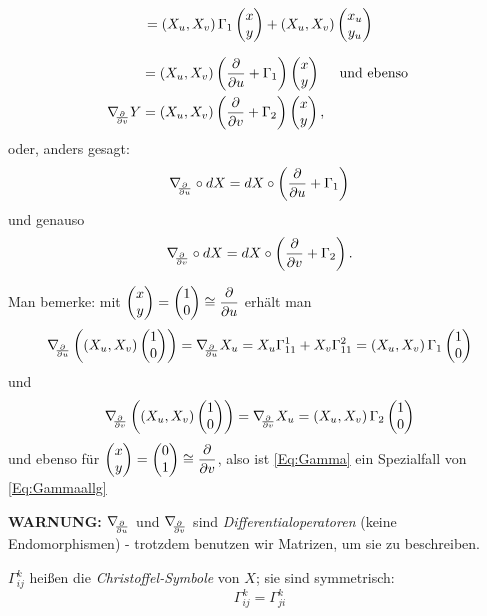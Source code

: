 		\[ = \left( X_u, X_v \right) \Gamma_1\begin{pmatrix} x \\ y \end{pmatrix} + \left( X_u, X_v \right) \begin{pmatrix} x_u \\ y_u \end{pmatrix} \] 
		
		\begin{equation} \label{Eq:Gammaallg}
		\begin{split}
			&= \left( X_u, X_v \right) \left( \dfrac{\partial}{\partial u} +\Gamma_1 \right) \begin{pmatrix} x \\ y \end{pmatrix}  \quad \text{ und ebenso }
		 \\ 
		 \nabla_{\!\!{\partial\over \partial v}}Y &= \left( X_u, X_v \right) \left( \dfrac{\partial}{\partial v} +\Gamma_2 \right) \begin{pmatrix} x \\ y \end{pmatrix}, 
		 \end{split}
		\end{equation} 
	oder, anders gesagt:
		\[ \nabla_{\!\!{\partial\over \partial u}} \circ dX = dX \circ \left( \dfrac{\partial}{\partial u} + \Gamma_1 \right)  \]
	und genauso
		\[  \nabla_{\!\!{\partial\over \partial v}} \circ dX = dX \circ \left( \dfrac{\partial}{\partial v} + \Gamma_2 \right).   \]	
	
	Man bemerke: mit $ \begin{pmatrix} x \\ y \end{pmatrix} = \begin{pmatrix} 1 \\ 0 \end{pmatrix} \cong \dfrac{\partial}{\partial u} $ erhält man
		\[ \nabla_{\!\!{\partial\over \partial u}}\left( \left( X_u,X_v \right) \begin{pmatrix} 1 \\ 0 \end{pmatrix} \right) = \nabla_{\!\!{\partial\over \partial u}}X_u = X_u \Gamma_{11}^1 + X_v\Gamma_{11}^2 = \left( X_u,X_v \right) \Gamma_1\begin{pmatrix} 1 \\ 0 \end{pmatrix}   \] 
	und
		\[ \nabla_{\!\!{\partial\over \partial v}} \left( \left( X_u,X_v \right) \begin{pmatrix} 1 \\ 0 \end{pmatrix} \right) = \nabla_{\!\!{\partial\over \partial v}}X_u = \left( X_u,X_v \right) \Gamma_2\begin{pmatrix} 1 \\ 0 \end{pmatrix} \]
	und ebenso für  $ \begin{pmatrix} x \\ y \end{pmatrix} = \begin{pmatrix} 0 \\ 1 \end{pmatrix} \cong \dfrac{\partial}{\partial v} $, also ist \ref*{Eq:Gamma} ein Spezialfall von \ref*{Eq:Gammaallg}
	
	\begin{remark}
		\textbf{WARNUNG:} $ \nabla_{\!\!{\partial\over \partial u}} $ und $ \nabla_{\!\!{\partial\over \partial v}} $ sind \emph{Differentialoperatoren} (keine Endomorphismen) - trotzdem benutzen wir Matrizen, um sie zu beschreiben.
	\end{remark}

\begin{lemma, definition}
	
	$\Gamma_{ij}^k$ heißen die \emph{Christoffel-Symbole} von $ X $; sie sind symmetrisch: 
		\[ \Gamma_{ij}^k = \Gamma_{ji}^k \]
	
\end{lemma, definition}

